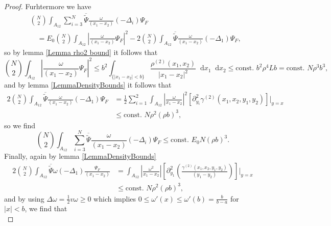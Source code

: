 \documentclass[a4paper,11pt]{article}
\newcommand{\abs}[1]{\left\lvert #1 \right\rvert}
\newcommand*\diff{\mathop{}\!\mathrm{d}}
\numberwithin{equation}{section}
\begin{document}
\begin{proof}
		Furhtermore we have \begin{equation}
		\begin{aligned}
		&\binom{N}{2}\int_{A_{12}}\sum_{i=3}^{N} \overline{\tilde{\Psi}}\frac{\omega}{(x_1-x_2)}(-\Delta_i)\Psi_F\\&\quad=E_0\binom{N}{2}\int_{A_{12}}\left\lvert\frac{\omega}{(x_1-x_2)}\Psi_F\right\rvert^2-2\binom{N}{2}\int_{A_{12}} \overline{\tilde{\Psi}}\frac{\omega}{(x_1-x_2)}(-\Delta_1)\Psi_F,
		\end{aligned}
		\end{equation}
		so by lemma \ref{Lemma rho2 bound} it follows that
		\begin{equation}
		\binom{N}{2}\int_{A_{12}}\left\lvert\frac{\omega}{(x_1-x_2)}\Psi_F\right\rvert^2\leq b^2\int_{\{\abs{x_1-x_2}<b\}} \frac{\rho^{(2)}(x_1,x_2)}{\abs{x_1-x_2}^2}\diff x_1\diff x_2\leq  \text{const. } b^2\rho^4  L b=\text{const. }N\rho^3 b^3,
		\end{equation}
		and by lemma \ref{LemmaDensityBounds} it follows that \begin{equation}
		\begin{aligned}
		2\binom{N}{2}\int_{A_{12}} \overline{\tilde{\Psi}}\frac{\omega}{(x_1-x_2)}(-\Delta_1)\Psi_F&=\frac12\sum_{i=1}^{2}\int_{A_{12}}\abs{\frac{\omega}{x_1-x_2}}^2\left[\partial^2_{y_i}\gamma^{(2)}(x_1,x_2,y_1,y_2)\right]\Big\rvert_{y=x}\\&\leq \text{const. } N\rho^2(\rho b)^3,
		\end{aligned}
		\end{equation}
		so we find \begin{equation}
		\binom{N}{2}\int_{A_{12}}\sum_{i=3}^{N} \overline{\tilde{\Psi}}\frac{\omega}{(x_1-x_2)}(-\Delta_i)\Psi_F\leq \text{const. } E_0 N(\rho b)^3.
		\end{equation}
		Finally, again by lemma \ref{LemmaDensityBounds} \begin{equation}
		\begin{aligned}
		2\binom{N}{2}\int_{A_{12}}\overline{\tilde{\Psi}}\omega(-\Delta_1)\frac{\Psi_F}{(x_1-x_2)}&=\int_{A_{12}}\abs{\frac{\omega^2}{x_1-x_2}}\left[\partial^2_{y_1}\left(\frac{\gamma^{(2)}(x_1,x_2,y_1,y_2)}{(y_1-y_2)}\right)\right]\Big\rvert_{y=x}\\&\leq\text{const. }N\rho^2 (\rho b)^3,
		\end{aligned}
		\end{equation}
		and by using $ \Delta\omega=\frac{1}{2}v\omega\geq0 $ which implies $ 0\leq\omega'(x)\leq \omega'(b)=\frac{b}{b-a} $ for $ \abs{x}<b $, we find that \begin{equation}

\end{equation}
\end{proof}
\end{document}
